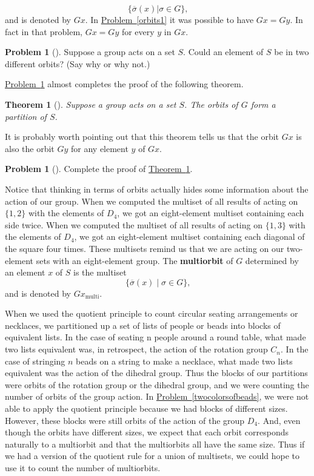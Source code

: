 \documentclass[10pt,]{book}
\newcommand{\terminology}[1]{\textbf{#1}}
\theoremstyle{plain}
\newtheorem{theorem}{Theorem}[section]
\theoremstyle{definition}
\newtheorem{activity}[project]{Problem}
\theoremstyle{definition}
\numberwithin{equation}{chapter}
\begin{document}
\begin{equation*}
\{\overline{\sigma}(x)| \sigma \in G\}\text{,}
\end{equation*}
and is denoted by \(Gx\). In \hyperref[orbits1]{Problem~\ref{orbits1}} it was possible to have \(Gx = Gy\). In fact in that problem, \(Gx = Gy\) for every \(y\) in \(Gx\).%
\begin{activity}[]\marginsymbol[-1em]{} \label{disjoint-orbits}
Suppose a group acts on a set \(S\). Could an element of \(S\) be in two different orbits? (Say why or why not.)%
\end{activity}
\hyperref[disjoint-orbits]{Problem~\ref{disjoint-orbits}} almost completes the proof of the following theorem.%
\begin{theorem}[{}]\label{thm-orbits-partition}
Suppose a group acts on a set \(S\). The orbits of \(G\) form a partition of \(S\).%
\end{theorem}
It is probably worth pointing out that this theorem tells us that the orbit \(Gx\) is also the orbit \(Gy\) for any element \(y\) of \(Gx\).%
\begin{activity}[]\marginsymbol[-1em]{} \label{activity-290}
Complete the proof of \hyperref[thm-orbits-partition]{Theorem~\ref{thm-orbits-partition}}.%
\end{activity}
Notice that thinking in terms of orbits actually hides some information about the action of our group. When we computed the multiset of all results of acting on \(\{1, 2\}\) with the elements of \(D_4\), we got an eight-element multiset containing each side twice. When we computed the multiset of all results of acting on \(\{1,3\}\) with the elements of \(D_4\), we got an eight-element multiset containing each diagonal of the square four times. These multisets remind us that we are acting on our two-element sets with an eight-element group. The \terminology{multiorbit} of \(G\) determined by an element \(x\) of \(S\) is the multiset%
\begin{equation*}
\{\overline{\sigma}(x)\mid \sigma \in G\}\text{,}
\end{equation*}
and is denoted by \(Gx_{\text{multi}}\).%
\par
When we used the quotient principle to count circular seating arrangements or necklaces, we partitioned up a set of lists of people or beads into blocks of equivalent lists. In the case of seating n people around a round table, what made two lists equivalent was, in retrospect, the action of the rotation group \(C_n\). In the case of stringing \(n\) beads on a string to make a necklace, what made two lists equivalent was the action of the dihedral group. Thus the blocks of our partitions were orbits of the rotation group or the dihedral group, and we were counting the number of orbits of the group action. In \hyperref[twocolorsofbeads]{Problem~\ref{twocolorsofbeads}}, we were not able to apply the quotient principle because we had blocks of different sizes. However, these blocks were still orbits of the action of the group \(D_4\). And, even though the orbits have different sizes, we expect that each orbit corresponds naturally to a multiorbit and that the multiorbits all have the same size. Thus if we had a version of the quotient rule for a union of multisets, we could hope to use it to count the number of multiorbits.%
\end{document}

